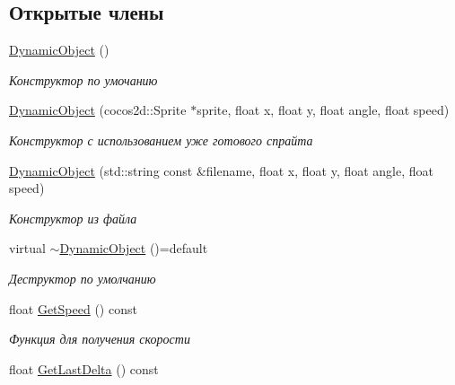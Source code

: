 \subsection*{Открытые члены}
\begin{DoxyCompactItemize}
\item 
\mbox{\label{classrtm_1_1_dynamic_object_aeb59f3ec97c939c5b12a8738206557c2}} 
\hyperlink{classrtm_1_1_dynamic_object_aeb59f3ec97c939c5b12a8738206557c2}{Dynamic\+Object} ()
\begin{DoxyCompactList}\small\item\em Конструктор по умочанию \end{DoxyCompactList}\item 
\hyperlink{classrtm_1_1_dynamic_object_a404c2232fe49bb759fd6a473d74131ed}{Dynamic\+Object} (cocos2d\+::\+Sprite $\ast$sprite, float x, float y, float angle, float speed)
\begin{DoxyCompactList}\small\item\em Конструктор с использованием уже готового спрайта \end{DoxyCompactList}\item 
\hyperlink{classrtm_1_1_dynamic_object_aa65c16292e48449c981ed3710d7a6a26}{Dynamic\+Object} (std\+::string const \&filename, float x, float y, float angle, float speed)
\begin{DoxyCompactList}\small\item\em Конструктор из файла \end{DoxyCompactList}\item 
\mbox{\label{classrtm_1_1_dynamic_object_ae98f1897c1299f8f0aa2d4994e23090a}} 
virtual \hyperlink{classrtm_1_1_dynamic_object_ae98f1897c1299f8f0aa2d4994e23090a}{$\sim$\+Dynamic\+Object} ()=default
\begin{DoxyCompactList}\small\item\em Деструктор по умолчанию \end{DoxyCompactList}\item 
float \hyperlink{classrtm_1_1_dynamic_object_ac75970216f8be37f7b5eefd1f506215f}{Get\+Speed} () const
\begin{DoxyCompactList}\small\item\em Функция для получения скорости \end{DoxyCompactList}\item 
float \hyperlink{classrtm_1_1_dynamic_object_ada2fd3defc1cea052020023b99be12ec}{Get\+Last\+Delta} () const

\end{DoxyCompactItemize}
